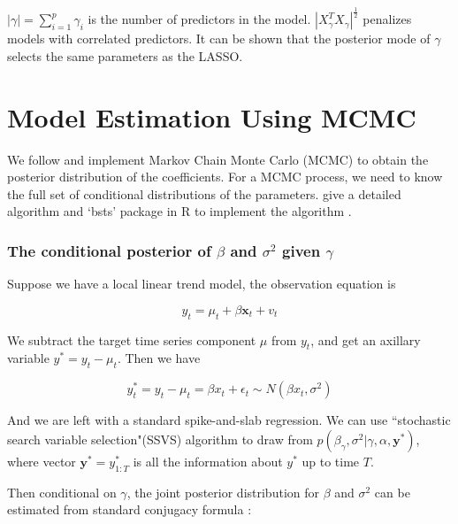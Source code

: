 $|\gamma| = \sum_{i=1}^{p} \gamma_i $ is the number of predictors in the model. $|X_{\gamma}^T X_{\gamma}|^{\frac{1}{2}}$ penalizes models with correlated predictors. It can be shown that the posterior mode of $\gamma$ selects the same parameters as the LASSO. 

\section{Model Estimation Using MCMC}
 

We follow    and implement  Markov Chain Monte Carlo (MCMC) to obtain the posterior distribution of the coefficients. For a MCMC process, we need to know the full set of conditional distributions of the parameters.   give a detailed algorithm and `bsts' package in R to implement the algorithm \cite{Scott2015}. 



\subsubsection{The conditional posterior of $\beta$ and $\sigma^2$ given $\gamma$}






Suppose we have a local linear trend model, the observation equation is  



$$y_t = \mu_t + \beta \mathbf{x}_t + v_{t}$$  




We subtract the target time series component $\mu$ from $y_t$, and get an axillary variable $y^* = y_t - \mu_t$.  Then we have  


$$y_t^* = y_t - \mu_t = \beta x_t + \epsilon_t \sim N(\beta x_t, \sigma^2)$$


And we are left with a standard spike-and-slab regression. We can use ``stochastic search variable selection"(SSVS) algorithm to draw from $p(\beta_{\gamma}, \sigma^2 | \gamma, \alpha, \mathbf{y}^*)$, where vector $\mathbf{y}^* = y_{1:T}^*$ is all the information about $y^*$ up to time $T$.   





Then conditional on $\gamma$, the joint posterior distribution for $\beta$ and $\sigma^2$ can be estimated from standard conjugacy formula \cite{Gelman2013} :   







